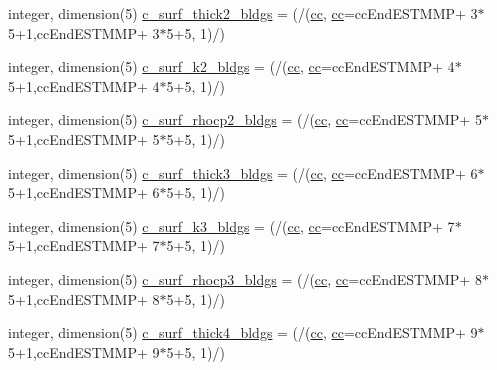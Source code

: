 \begin{DoxyCompactItemize}
integer, dimension(5) \hyperlink{namespaceallocatearray_a4d869e9f6bbea24bd21da74dc1adc704}{c\+\_\+surf\+\_\+thick2\+\_\+bldgs} = (/(\hyperlink{namespaceallocatearray_ac863c81704eb507dee10f5e10741e10c}{cc}, \hyperlink{namespaceallocatearray_ac863c81704eb507dee10f5e10741e10c}{cc}=cc\+End\+E\+S\+T\+M\+MP+ 3$\ast$5+1,cc\+End\+E\+S\+T\+M\+MP+ 3$\ast$5+5, 1)/)
\item 
integer, dimension(5) \hyperlink{namespaceallocatearray_a68884558810ea3ed48c5955a3fa9424f}{c\+\_\+surf\+\_\+k2\+\_\+bldgs} = (/(\hyperlink{namespaceallocatearray_ac863c81704eb507dee10f5e10741e10c}{cc}, \hyperlink{namespaceallocatearray_ac863c81704eb507dee10f5e10741e10c}{cc}=cc\+End\+E\+S\+T\+M\+MP+ 4$\ast$5+1,cc\+End\+E\+S\+T\+M\+MP+ 4$\ast$5+5, 1)/)
\item 
integer, dimension(5) \hyperlink{namespaceallocatearray_a2f5bad25e3bd8e03f5a04b8227c01703}{c\+\_\+surf\+\_\+rhocp2\+\_\+bldgs} = (/(\hyperlink{namespaceallocatearray_ac863c81704eb507dee10f5e10741e10c}{cc}, \hyperlink{namespaceallocatearray_ac863c81704eb507dee10f5e10741e10c}{cc}=cc\+End\+E\+S\+T\+M\+MP+ 5$\ast$5+1,cc\+End\+E\+S\+T\+M\+MP+ 5$\ast$5+5, 1)/)
\item 
integer, dimension(5) \hyperlink{namespaceallocatearray_a2cd78a5f2dd77b5bb37d6c6ced2829b5}{c\+\_\+surf\+\_\+thick3\+\_\+bldgs} = (/(\hyperlink{namespaceallocatearray_ac863c81704eb507dee10f5e10741e10c}{cc}, \hyperlink{namespaceallocatearray_ac863c81704eb507dee10f5e10741e10c}{cc}=cc\+End\+E\+S\+T\+M\+MP+ 6$\ast$5+1,cc\+End\+E\+S\+T\+M\+MP+ 6$\ast$5+5, 1)/)
\item 
integer, dimension(5) \hyperlink{namespaceallocatearray_a0dde0883f6fd035daedd64579708e13d}{c\+\_\+surf\+\_\+k3\+\_\+bldgs} = (/(\hyperlink{namespaceallocatearray_ac863c81704eb507dee10f5e10741e10c}{cc}, \hyperlink{namespaceallocatearray_ac863c81704eb507dee10f5e10741e10c}{cc}=cc\+End\+E\+S\+T\+M\+MP+ 7$\ast$5+1,cc\+End\+E\+S\+T\+M\+MP+ 7$\ast$5+5, 1)/)
\item 
integer, dimension(5) \hyperlink{namespaceallocatearray_aef54fff4822161f28c6c3da862df5520}{c\+\_\+surf\+\_\+rhocp3\+\_\+bldgs} = (/(\hyperlink{namespaceallocatearray_ac863c81704eb507dee10f5e10741e10c}{cc}, \hyperlink{namespaceallocatearray_ac863c81704eb507dee10f5e10741e10c}{cc}=cc\+End\+E\+S\+T\+M\+MP+ 8$\ast$5+1,cc\+End\+E\+S\+T\+M\+MP+ 8$\ast$5+5, 1)/)
\item 
integer, dimension(5) \hyperlink{namespaceallocatearray_ac2194bcb7399903732a361af05dd38b7}{c\+\_\+surf\+\_\+thick4\+\_\+bldgs} = (/(\hyperlink{namespaceallocatearray_ac863c81704eb507dee10f5e10741e10c}{cc}, \hyperlink{namespaceallocatearray_ac863c81704eb507dee10f5e10741e10c}{cc}=cc\+End\+E\+S\+T\+M\+MP+ 9$\ast$5+1,cc\+End\+E\+S\+T\+M\+MP+ 9$\ast$5+5, 1)/)

\end{DoxyCompactItemize}
